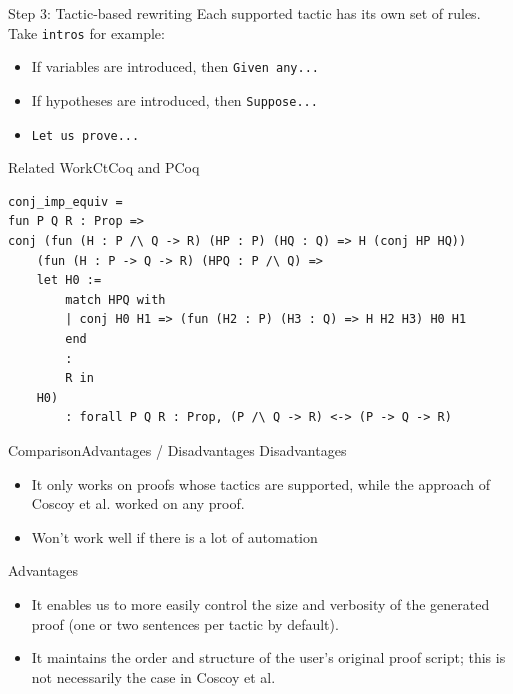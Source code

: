 \documentclass[pdf]{beamer}
\begin{document}
\begin{frame}{Step 3: Tactic-based rewriting}
Each supported tactic has its own set of rules. Take {\tt intros} for example:
\begin{itemize}
    \item If variables are introduced, then {\tt Given any...}
    \item If hypotheses are introduced, then {\tt Suppose...}
    \item {\tt Let us prove...}
\end{itemize}
\end{frame}

\begin{frame}[fragile]{Related Work}{CtCoq and PCoq}


\begin{adjustbox}{minipage=\linewidth,bgcolor=coqatoo-gray,trim=-3pt 5pt -3pt 5pt}            
\begin{lstlisting}
conj_imp_equiv = 
fun P Q R : Prop =>
conj (fun (H : P /\ Q -> R) (HP : P) (HQ : Q) => H (conj HP HQ))
    (fun (H : P -> Q -> R) (HPQ : P /\ Q) =>
    let H0 :=
        match HPQ with
        | conj H0 H1 => (fun (H2 : P) (H3 : Q) => H H2 H3) H0 H1
        end
        :
        R in
    H0)
        : forall P Q R : Prop, (P /\ Q -> R) <-> (P -> Q -> R)
\end{lstlisting}
\end{adjustbox}
\end{frame}


\begin{frame}{Comparison}{Advantages / Disadvantages}
    Disadvantages
    \begin{itemize}
        \item{It only works on proofs whose tactics are supported, while the approach of Coscoy et al. worked on any proof.}
        \item{Won't work well if there is a lot of automation}
    \end{itemize}

    Advantages
    \begin{itemize}
        \item{It enables us to more easily control the size and verbosity of the generated proof (one or two sentences per tactic by default).}
        \item{It maintains the order and structure of the user's original proof script; this is not necessarily the case in Coscoy et al. }
      \end{itemize}
\end{frame}
\end{document}

